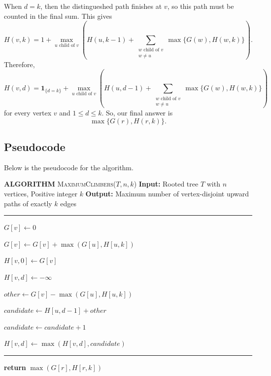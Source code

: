 \documentclass[11pt]{scrartcl}
\theoremstyle{plain}
\theoremstyle{definition}
\theoremstyle{remark}
\begin{document}
When $d = k$, then the distingueshed path finishes at $v$, so this path must be counted in the final sum. This gives \[H(v, k) = 1 + \max_{u \text{ child of } v}\left(H(u, k-1) + \sum_{\substack{w \text{ child of } v\\ w\neq u}}\max\{G(w), H(w, k)\}\right).\]
Therefore, \[H(v, d) = \textbf{1}_{\{d = k\}} + \max_{u \text{ child of } v} \left(H(u, d-1) + \sum_{\substack{w \text{ child of } v\\ w\neq u}}\max\{G(w), H(w, k)\}\right)\]for every vertex $v$ and $1\leq d\leq k$.
So, our final answer is $$\max\{G(r), H(r, k)\}.$$

\subsection{Pseudocode}
Below is the pseudocode for the algorithm. 
\begin{algorithm}[H]
\caption{\textbf{Maximum Number of Climbers Calculation}}\label{alg:max_climbers}
\begin{algorithmic}
    \Statex \textbf{ALGORITHM} \textsc{MaximumClimbers}($T, n, k$)
    \Statex \textbf{Input:} Rooted tree $T$ with $n$ vertices, Positive integer $k$
    \Statex \textbf{Output:} Maximum number of vertex-disjoint upward paths of exactly $k$ edges
    \Statex \rule{\linewidth}{0.5pt}
    
        \State $G[v] \gets 0$
        
            \State $G[v] \gets G[v] + \max(G[u], H[u, k])$
        \EndFor
        
        \State $H[v, 0] \gets G[v]$
        
            \State $H[v, d] \gets -\infty$
            
                \State $\mathit{other} \gets G[v] - \max(G[u], H[u, k])$
                
                    \State $\mathit{candidate} \gets H[u, d-1] + \mathit{other}$
                    
                        \State $\mathit{candidate} \gets \mathit{candidate} + 1$
                    \EndIf
                    
                    \State $H[v, d] \gets \max(H[v, d], \mathit{candidate})$
                \EndIf
            \EndFor
        \EndFor
    \EndFor
    
    \Statex \rule{\linewidth}{0.3pt}
    \State \textbf{return} $\max(G[r], H[r, k])$
\end{algorithmic}
\end{algorithm}
\end{document}
